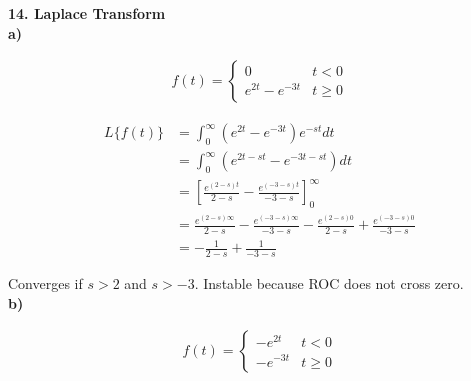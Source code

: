 %
%

\textbf{\large 14. Laplace Transform}
\\

\textbf{a)}

\begin{align}
    f(t) = 
    \begin{cases}
        0 & t < 0 \\
        e^{2t} - e^{-3t} & t \geq 0
    \end{cases} 
\end{align}

\begin{align*}
    L\{f(t)\} &= \int_0^\infty \left( e^{2t} - e^{-3t} \right) e^{-st} dt \\
    &= \int_0^\infty \left( e^{2t-st} - e^{-3t-st} \right) dt \\
    &= \left[ \frac{e^{(2-s)t}}{2-s} - \frac{e^{(-3-s)t}}{-3-s} \right]_0^\infty\\
    &= \frac{e^{(2-s)\infty}}{2-s} - \frac{e^{(-3-s)\infty}}{-3-s} - \frac{e^{(2-s)0}}{2-s} + \frac{e^{(-3-s)0}}{-3-s}\\
    &=  - \frac{1}{2-s} + \frac{1}{-3-s}
\end{align*}

Converges if $s > 2$ and $s > -3$.
Instable because ROC does not cross zero.
\\

\textbf{b)}

\begin{align}
    f(t) = 
    \begin{cases}
        -e^{2t} & t < 0 \\
        -e^{-3t} & t \geq 0
    \end{cases} 
\end{align}

